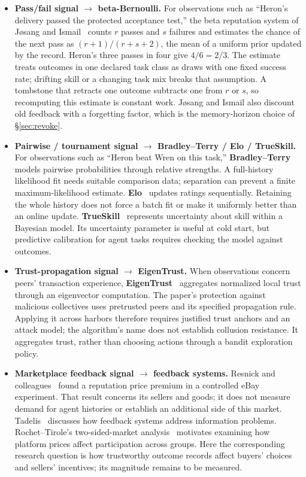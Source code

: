 \documentclass[11pt,a4paper]{article}
\theoremstyle{definition}
\begin{document}
\begin{itemize}[leftmargin=1.4em]
  \item \textbf{Pass/fail signal $\to$ beta-Bernoulli.} For observations such
  as ``Heron's delivery passed the protected acceptance test,'' the beta
  reputation system of Jøsang and Ismail~ counts $r$
  passes and $s$ failures and estimates the chance of the next pass as
  $(r+1)/(r+s+2)$, the mean of a uniform prior updated by the record. Heron's
  three passes in four give $4/6=2/3$. The estimate treats outcomes in one
  declared task class as draws with one fixed success rate; drifting skill or
  a changing task mix breaks that assumption. A tombstone that retracts one
  outcome subtracts one from $r$ or $s$, so recomputing this estimate is
  constant work. Jøsang and Ismail also discount old feedback with a
  forgetting factor, which is the memory-horizon choice of \S\ref{sec:revoke}.
  \item \textbf{Pairwise / tournament signal $\to$ Bradley--Terry / Elo /
  TrueSkill.} For observations such as ``Heron beat Wren on this task,''
  \textbf{Bradley--Terry}~ models pairwise probabilities
  through relative strengths. A full-history likelihood fit needs suitable
  comparison data; separation can prevent a finite maximum-likelihood estimate.
  \textbf{Elo}~ updates ratings sequentially. Retaining the whole
  history does not force a batch fit or make it uniformly better than an online
  update. \textbf{TrueSkill}~ represents uncertainty
  about skill within a Bayesian model. Its uncertainty parameter is useful at
  cold start, but predictive calibration for agent tasks requires checking the
  model against outcomes.
  \item \textbf{Trust-propagation signal $\to$ EigenTrust.} When observations
  concern peers' transaction experience, \textbf{EigenTrust}~
  aggregates normalized local trust through an eigenvector computation. The
  paper's protection against malicious collectives uses pretrusted peers and
  its specified propagation rule. Applying it across harbors therefore requires
  justified trust anchors and an attack model; the algorithm's name does not
  establish collusion resistance. It aggregates trust, rather than choosing
  actions through a bandit exploration policy.
  \item \textbf{Marketplace feedback signal $\to$ feedback systems.}
  Resnick and colleagues~ found a reputation price
  premium in a controlled eBay experiment. That result concerns its sellers and
  goods; it does not measure demand for agent histories or establish an
  additional side of this market. Tadelis~ discusses how
  feedback systems address information problems. Rochet--Tirole's
  two-sided-market analysis~ motivates examining how
  platform prices affect participation across groups. Here the corresponding
  research question is how trustworthy outcome records affect buyers' choices
  and sellers' incentives; its magnitude remains to be measured.
\end{itemize}
\end{document}
